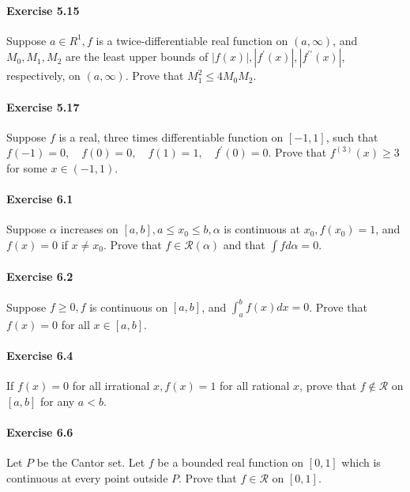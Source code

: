 \documentclass{article}
\theoremstyle{definition}
\begin{document}
\paragraph{Exercise 5.15} Suppose $a \in R^{1}, f$ is a twice-differentiable real function on $(a, \infty)$, and $M_{0}, M_{1}, M_{2}$ are the least upper bounds of $|f(x)|,\left|f^{\prime}(x)\right|,\left|f^{\prime \prime}(x)\right|$, respectively, on $(a, \infty)$. Prove that $M_{1}^{2} \leq 4 M_{0} M_{2} .$

\paragraph{Exercise 5.17} Suppose $f$ is a real, three times differentiable function on $[-1,1]$, such that $f(-1)=0, \quad f(0)=0, \quad f(1)=1, \quad f^{\prime}(0)=0 .$ Prove that $f^{(3)}(x) \geq 3$ for some $x \in(-1,1)$.

\paragraph{Exercise 6.1} Suppose $\alpha$ increases on $[a, b], a \leq x_{0} \leq b, \alpha$ is continuous at $x_{0}, f\left(x_{0}\right)=1$, and $f(x)=0$ if $x \neq x_{0}$. Prove that $f \in \mathcal{R}(\alpha)$ and that $\int f d \alpha=0$.

\paragraph{Exercise 6.2} Suppose $f \geq 0, f$ is continuous on $[a, b]$, and $\int_{a}^{b} f(x) d x=0$. Prove that $f(x)=0$ for all $x \in[a, b]$.

\paragraph{Exercise 6.4} If $f(x)=0$ for all irrational $x, f(x)=1$ for all rational $x$, prove that $f \notin \mathcal{R}$ on $[a, b]$ for any $a<b$.

\paragraph{Exercise 6.6} Let $P$ be the Cantor set. Let $f$ be a bounded real function on $[0,1]$ which is continuous at every point outside $P$. Prove that $f \in \mathcal{R}$ on $[0,1]$.
\end{document}
